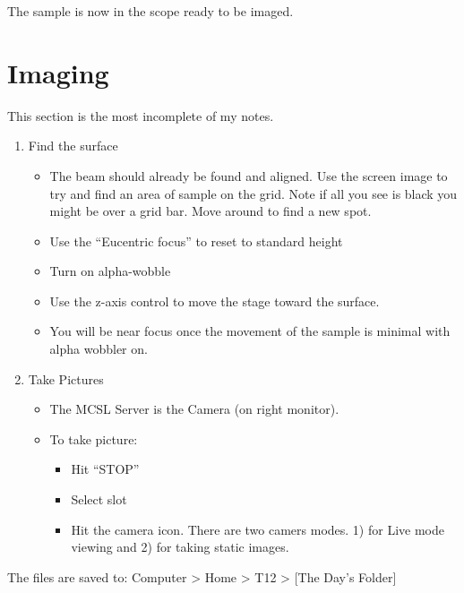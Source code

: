 \documentclass[]{book}
\providecommand{\tightlist}{%
  \setlength{\itemsep}{0pt}\setlength{\parskip}{0pt}}
\begin{document}
The sample is now in the scope ready to be imaged.

\hypertarget{imaging}{%
\chapter{Imaging}\label{imaging}}

This section is the most incomplete of my notes.

\begin{enumerate}
\def\labelenumi{\arabic{enumi})}
\tightlist
\item
  Find the surface

  \begin{itemize}
  \item
    The beam should already be found and aligned. Use the screen image to try and find an area of sample on the grid. Note if all you see is black you might be over a grid bar. Move around to find a new spot.
  \item
    Use the ``Eucentric focus'' to reset to standard height
  \item
    Turn on alpha-wobble
  \item
    Use the z-axis control to move the stage toward the surface.
  \item
    You will be near focus once the movement of the sample is minimal with alpha wobbler on.
  \end{itemize}
\item
  Take Pictures

  \begin{itemize}
  \item
    The MCSL Server is the Camera (on right monitor).
  \item
    To take picture:

    \begin{itemize}
    \tightlist
    \item
      Hit ``STOP''
    \item
      Select slot
    \item
      Hit the camera icon. There are two camers modes. 1) for Live mode viewing and 2) for taking static images.
    \end{itemize}
  \end{itemize}
\end{enumerate}

The files are saved to: Computer \textgreater{} Home \textgreater{} T12 \textgreater{} {[}The Day's Folder{]}


\end{document}
